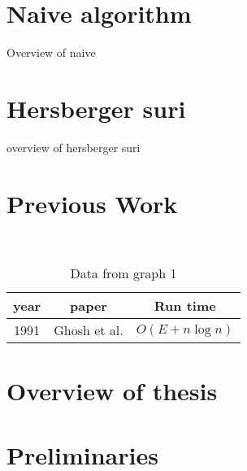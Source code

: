\section{Naive algorithm}
Overview of naive
\section{Hersberger suri}
overview of hersberger suri
\section{Previous Work}
\
\begin{table}[H]
\begin{tabular}{ c c c } 
	\hline
	year & paper & Run time \\
	\hline
	1991 & Ghosh et al. \cite{GhoshM91} & $O(E+n\log n)$ \\ %
	\hline

\end{tabular}
\caption{Data from graph 1}
\end{table}
\section{Overview of thesis}
\section{Preliminaries}
